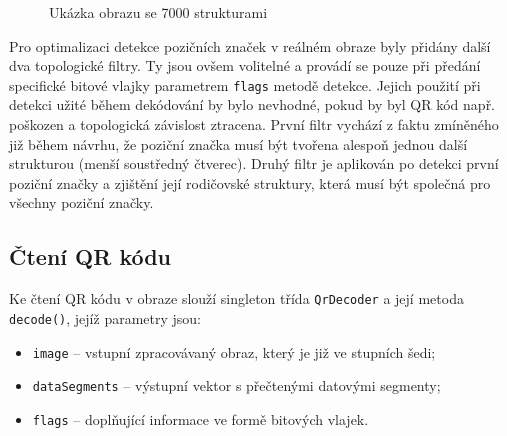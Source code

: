 \begin{figure}[H]
  \begin{center}
    \caption{Ukázka obrazu se 7000 strukturami}
    \label{SevenThousandsStructures}
  \end{center}
\end{figure}

Pro optimalizaci detekce pozičních značek v reálném obraze byly přidány další
dva topologické filtry. Ty jsou ovšem volitelné a provádí se pouze při předání
specifické bitové vlajky parametrem \texttt{flags} metodě detekce. Jejich
použití při detekci užité během dekódování by bylo nevhodné, pokud by byl QR kód např.
poškozen a topologická závislost ztracena. První filtr vychází z faktu zmíněného
již během návrhu, že poziční značka musí být tvořena alespoň jednou další
strukturou (menší soustředný čtverec). Druhý filtr je aplikován po detekci první
poziční značky a zjištění její rodičovské struktury, která musí být společná pro
všechny poziční značky.

\subsection{Čtení QR kódu}
\label{cteniQrKoduBarcodesLibr}

Ke čtení QR kódu v obraze slouží singleton třída \texttt{QrDecoder} a její
metoda \texttt{decode()}, jejíž parametry jsou:

\begin{itemize}
  \item \texttt{image} -- vstupní zpracovávaný obraz, který je již ve stupních
  šedi;
  \item \texttt{dataSegments} -- výstupní vektor s přečtenými datovými segmenty;
  \item \texttt{flags} -- doplňující informace ve formě bitových vlajek.
\end{itemize}

